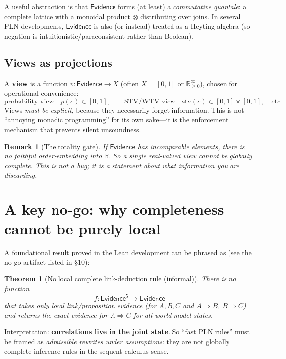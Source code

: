 \documentclass[11pt]{article}
\newtheorem{theorem}{Theorem}
\newtheorem{remark}{Remark}
\newcommand{\Evidence}{\mathsf{Evidence}}
\newcommand{\tensor}{\mathbin{\otimes}}  %
\begin{document}
A useful abstraction is that $\Evidence$ forms (at least) a \emph{commutative quantale}:
a complete lattice with a monoidal product $\tensor$ distributing over joins.
In several PLN developments, $\Evidence$ is also (or instead) treated as a Heyting algebra
(so negation is intuitionistic/paraconsistent rather than Boolean).

\subsection{Views as projections}

A \textbf{view} is a function $v:\Evidence\to X$ (often $X=[0,1]$ or $\mathbb{R}_{\ge 0}^\infty$),
chosen for operational convenience:
\[
  \text{probability view}\quad p(e) \in [0,1], \qquad
  \text{STV/WTV view}\quad \mathrm{stv}(e)\in [0,1]\times[0,1], \quad \text{etc.}
\]
Views \emph{must be explicit}, because they necessarily forget information.
This is not ``annoying monadic programming'' for its own sake---it is the enforcement
mechanism that prevents silent unsoundness.

\begin{remark}[The totality gate]
If $\Evidence$ has incomparable elements, there is no faithful order-embedding into $\mathbb{R}$.
So a single real-valued view cannot be globally complete.
This is not a bug; it is a statement about what information you are discarding.
\end{remark}

\section{A key no-go: why completeness cannot be purely local}

A foundational result proved in the Lean development can be phrased as
(see the no-go artifact listed in \S10):

\begin{theorem}[No local complete link-deduction rule (informal)]
There is no function
\[
  f:\Evidence^5\to \Evidence
\]
that takes only \emph{local} link/proposition evidence (for $A,B,C$ and $A\Rightarrow B$, $B\Rightarrow C$)
and returns the \emph{exact} evidence for $A\Rightarrow C$ for \emph{all} world-model states.
\end{theorem}

Interpretation: \textbf{correlations live in the joint state}.
So ``fast PLN rules'' must be framed as \emph{admissible rewrites under assumptions}:
they are not globally complete inference rules in the sequent-calculus sense.
\end{document}
